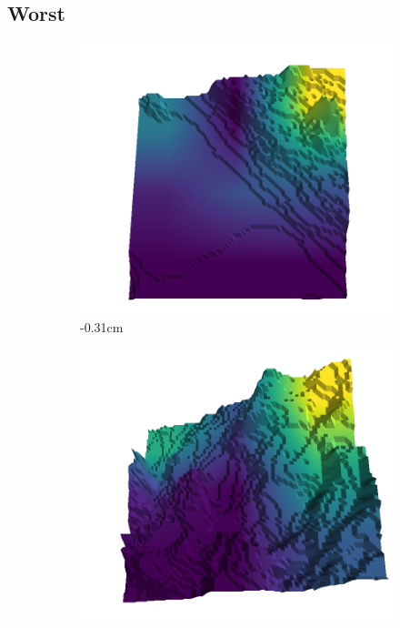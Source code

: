 \documentclass[../document.tex]{subfiles}
\begin{document}
\subsection{Worst}
\begin{figure}[H]
    \centering
    \begin{subfigure}[b]{0.242\linewidth}
    \includegraphics[width=\linewidth]{../img/5/quarry/worst/-31-patch-3d-majavi-colormap-0.png}
    \caption{-0.31cm}
    \end{subfigure}
    \begin{subfigure}[b]{0.242\linewidth}
    \includegraphics[width=\linewidth]{../img/5/quarry/worst/-5-patch-3d-majavi-colormap-5.png}

\end{subfigure}
\end{figure}
\end{document}
